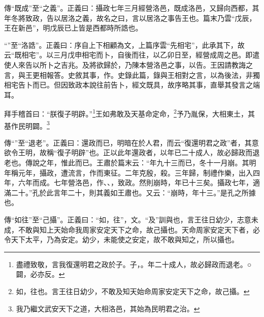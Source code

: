 {\noindent\zhuan{}\fzbyks 傳“既成”至“之義”。正義曰：攝政七年三月經營洛邑，既成洛邑，又歸向西都，其年冬將致政，告以居洛之義，故名之曰，言以居洛之事告王也。篇末乃雲“戊辰，王在新邑”，明戊辰已上皆是西都時所誥也。 \par}

{\noindent\shu{}\fzkt “”至“洛誥”。正義曰：序自上下相顧為文，上篇序雲“先相宅”，此承其下，故云“既相宅”。以三月戊申相宅而卜，自後而往，以乙卯日至，經營成周之邑。即遣使人來告以所卜之吉兆。及將欲歸於，乃陳本營洛邑之事，以告。王因請教誨之言，與王更相報答。史敘其事，作。史錄此篇，錄與王相對之言，以為後法，非獨相宅告卜而已。但因致政本說往前告卜，經文既具，故序略其事，直舉其發言之端耳。 \par}

拜手稽首曰：“朕復子明辟。”\footnote{盡禮致敬，言我復還明君之政於子。子，。年二十成人，故必歸政而退老。○闢，必亦反。}王如弗敢及天基命定命，\footnote{如，往也。言王往日幼少，不敢及知天始命周家安定天下之命，故己攝。}予乃胤保，大相東土，其基作民明闢。\footnote{我乃繼文武安天下之道，大相洛邑，其始為民明君之治。}


{\noindent\zhuan{}\fzbyks 傳“”至“退老”。正義曰：還政而已，明暗在於人君，而云“復還明君之政”者，其意欲令王明，故稱“復子明辟”也。正以此年還政者，以年已二十成人，故必歸政而退老也。傳說之年，惟此而已。王肅於篇末云：“年九十三而已，冬十一月崩。其明年稱元年，攝政，遭流言，作而東征。二年克殷，殺。三年歸，制禮作樂，出入四年，六年而成。七年營洛邑，作、、，致政。然則崩時，年已十三矣。攝政七年，適滿二十。”孔於此言年二十，則其義如王肅也。又云：“崩時，年十三。”是孔之所據也。 \par}

{\noindent\zhuan{}\fzbyks 傳“如往”至“己攝”。正義曰：“如，往”，文。“及”訓與也，言王往日幼少，志意未成，不敢與知上天始命我周家安定天下之命，故己攝也。天命周家安定天下者，必令天下太平，乃為安定。幼少，未能使之安定，故不敢與知之，所以攝也。 \par}

